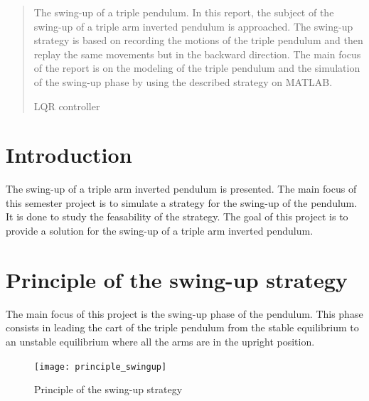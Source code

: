 \documentclass[a4paper,12pt,twoside]{article}
\begin{document}
\renewcommand{\headheight}{14.5pt}
\renewcommand{\tablename}{Table}
\renewcommand{\figurename}{Figure}


\newpage
\tableofcontents
\newpage


\begin{abstract}
The swing-up of a triple pendulum.
In this report, the subject of the swing-up of a triple arm inverted pendulum is approached. The swing-up strategy is based on recording the motions of the triple pendulum and then replay the same movements but in the backward direction. The main focus of the report is on the modeling of the triple pendulum and the simulation of the swing-up phase by using the described strategy on MATLAB.

LQR controller
\end{abstract}

\section{Introduction}\label{sec:intro} %
The swing-up of a triple arm inverted pendulum is presented. The main focus of this semester project is to simulate a strategy for the swing-up of the pendulum. It is done to study the feasability of the strategy.
The goal of this project is to provide a solution for the swing-up of a triple arm inverted pendulum.

\section{Principle of the swing-up strategy}
The main focus of this project is the swing-up phase of the pendulum. This phase consists in leading the cart of the triple pendulum from the stable equilibrium to an unstable equilibrium where all the arms are in the upright position.
\begin{figure}[ht]
	\centering
	\texttt{[image: principle\_swingup]}
	\caption{Principle of the swing-up strategy}
	\label{fig:swingup_strategy}
\end{figure}
\end{document}
